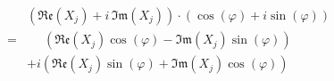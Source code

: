 \documentclass[a4paper, 12pt]{article}
\def\realpart{\mathfrak{Re}}
\def\imagpart{\mathfrak{Im}}
\begin{document}
\begin{align*}
~& \left( \realpart(X_j) + i \, \imagpart(X_j) \right) \cdot \left( \cos(\varphi) + i \sin(\varphi) \right) \\
=& \phantom{+ i}~ \left( \realpart(X_j) \cos(\varphi) - \imagpart(X_j) \sin(\varphi) \right) \\
~&          + i   \left( \realpart(X_j) \sin(\varphi) + \imagpart(X_j) \cos(\varphi) \right)
\end{align*}
\end{document}

